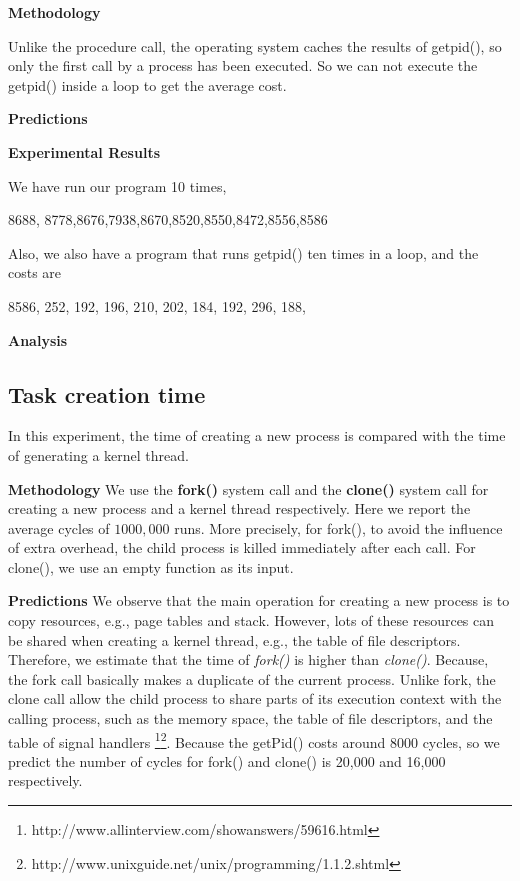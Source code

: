 \noindent\textbf{Methodology}

Unlike the procedure call, the operating system caches the results of getpid(), so only the first call by a process has been executed. So we can not execute the getpid() inside a loop to get the average cost.

\noindent\textbf{Predictions}


\noindent\textbf{Experimental Results}

We have run our program 10 times,

8688, 8778,8676,7938,8670,8520,8550,8472,8556,8586

Also, we also have a program that runs getpid() ten times in a loop, and the costs are

8586, 252, 192, 196, 210, 202, 184, 192, 296, 188,

\noindent\textbf{Analysis}


\subsection{Task creation time}
In this experiment, the time of creating a new process is compared with the time of generating a kernel thread.

\noindent\textbf{Methodology}
We use the \textbf{fork()} system call and the \textbf{clone()} system call for creating a new process and a kernel thread respectively. Here we report the average cycles of $1000,000$ runs. More precisely, for fork(), to avoid the influence of extra overhead, the child process is killed immediately after each call. For clone(), we use an empty function as its input.


\noindent\textbf{Predictions}
We observe that the main operation for creating a new process is to copy resources, e.g., page tables and stack. However, lots of these resources can be shared when creating a kernel thread, e.g., the table of file descriptors. Therefore, we estimate that the time of \textit{fork()} is higher than \textit{clone()}. Because, the fork call basically makes a duplicate of the current process. Unlike fork, the clone call allow the child process to share parts of its execution context with the calling process, such as the memory space, the table of file descriptors, and the table of signal handlers \footnote{http://www.allinterview.com/showanswers/59616.html}\footnote{http://www.unixguide.net/unix/programming/1.1.2.shtml}.  Because the getPid() costs around 8000 cycles, so we predict the number of cycles for fork() and clone() is 20,000 and 16,000 respectively.

